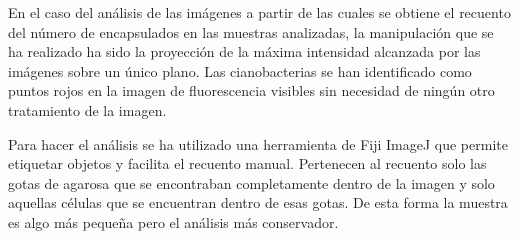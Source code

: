 En el caso del análisis de las imágenes a partir de las cuales se obtiene el recuento del número de encapsulados en las muestras analizadas, la manipulación que se ha realizado ha sido la proyección de la máxima intensidad alcanzada por las imágenes sobre un único plano. Las cianobacterias se han identificado como puntos rojos en la imagen de fluorescencia visibles sin necesidad de ningún otro tratamiento de la imagen. 

Para hacer el análisis se ha utilizado una herramienta de Fiji ImageJ que permite etiquetar objetos y facilita el recuento manual. Pertenecen al recuento solo las gotas de agarosa que se encontraban completamente dentro de la imagen y solo aquellas células que se encuentran dentro de esas gotas. De esta forma la muestra es algo más pequeña pero el análisis más conservador.